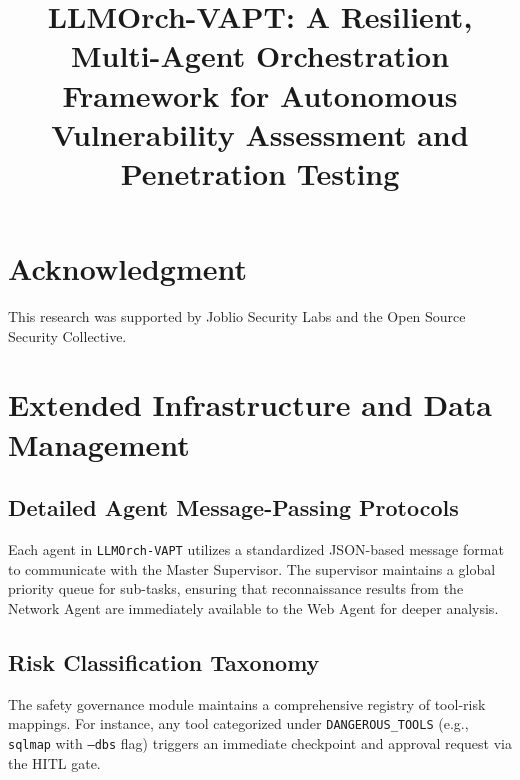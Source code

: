 \documentclass[conference,compsoc]{IEEEtran}
\begin{document}
\title{LLMOrch-VAPT: A Resilient, Multi-Agent Orchestration Framework for Autonomous Vulnerability Assessment and Penetration Testing}

\author{
}

\maketitle









\section*{Acknowledgment}
This research was supported by Joblio Security Labs and the Open Source Security Collective.




\appendices
\section{Extended Infrastructure and Data Management}
\subsection{Detailed Agent Message-Passing Protocols}
Each agent in \texttt{LLMOrch-VAPT} utilizes a standardized JSON-based message format to communicate with the Master Supervisor. The supervisor maintains a global priority queue for sub-tasks, ensuring that reconnaissance results from the Network Agent are immediately available to the Web Agent for deeper analysis.

\subsection{Risk Classification Taxonomy}
The safety governance module maintains a comprehensive registry of tool-risk mappings. For instance, any tool categorized under \texttt{DANGEROUS\_TOOLS} (e.g., \texttt{sqlmap} with \texttt{--dbs} flag) triggers an immediate checkpoint and approval request via the HITL gate.
\end{document}
